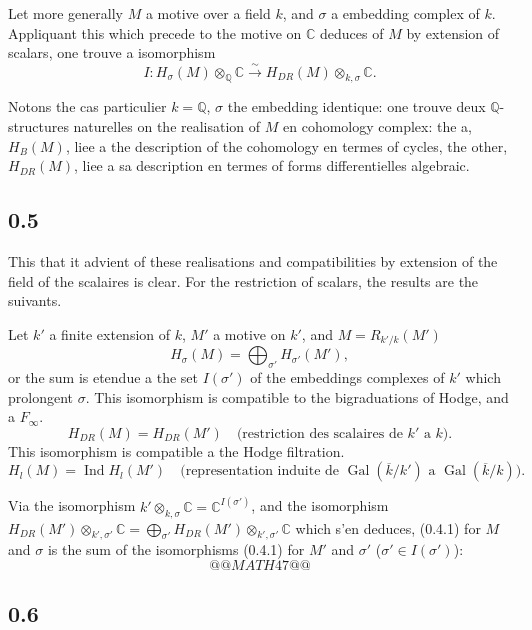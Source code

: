 \documentclass[12pt,a4paper]{article}
\theoremstyle{plain}
\theoremstyle{definition}
\theoremstyle{remark}
\DeclareMathOperator{\Gal}{Gal}
\DeclareMathOperator{\Ind}{Ind}
\newcommand{\Q}{\mathbb{Q}}
\newcommand{\C}{\mathbb{C}}
\begin{document}
Let more generally $M$ a motive over a field $k$, and $\sigma$ a embedding complex of $k$.
Appliquant this which precede to the motive on $\C$ deduces of $M$ by extension of scalars, one
trouve a isomorphism
\[
I: H_\sigma(M) \otimes_{\Q} \C \xrightarrow{\sim} H_{DR}(M) \otimes_{k,\sigma} \C.
\]

Notons the cas particulier $k = \Q$, $\sigma$ the embedding identique: one trouve deux
$\Q$-structures naturelles on the realisation of $M$ en cohomology complex: the a,
$H_B(M)$, liee a the description of the cohomology en termes of cycles, the other,
$H_{DR}(M)$, liee a sa description en termes of forms differentielles algebraic.

\subsection*{0.5}

This that it advient of these realisations and compatibilities by extension of the field of the scalaires
is clear. For the restriction of scalars, the results are the suivants.

Let $k'$ a finite extension of $k$, $M'$ a motive on $k'$, and $M = R_{k'/k}(M')$
\begin{equation}\label{eq:0.5.1}
H_\sigma(M) = \bigoplus_{\sigma'} H_{\sigma'}(M'),
\end{equation}
or the sum is etendue a the set $I(\sigma')$ of the embeddings complexes of $k'$ which
prolongent $\sigma$. This isomorphism is compatible to the bigraduations of Hodge, and a
$F_\infty$.
\begin{equation}\label{eq:0.5.2}
H_{DR}(M) = H_{DR}(M') \quad \text{(restriction des scalaires de } k' \text{ a } k \text{).}
\end{equation}
This isomorphism is compatible a the Hodge filtration.
\begin{equation}\label{eq:0.5.3}
H_l(M) = \Ind H_l(M') \quad \text{(representation induite de } \Gal(\overline{k}/k') \text{ a } \Gal(\overline{k}/k) \text{).}
\end{equation}

Via the isomorphism $k' \otimes_{k,\sigma} \C = \C^{I(\sigma')}$, and the isomorphism
$H_{DR}(M') \otimes_{k',\sigma'} \C = \bigoplus_{\sigma'} H_{DR}(M') \otimes_{k',\sigma'} \C$
which s'en deduces, (0.4.1) for $M$ and $\sigma$ is the sum of the isomorphisms (0.4.1) for
$M'$ and $\sigma'$ ($\sigma' \in I(\sigma')$):
\[
@@MATH47@@
\]


\subsection*{0.6}
\end{document}
